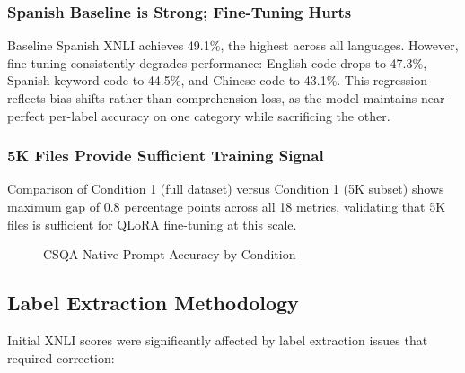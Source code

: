 \documentclass[conference]{IEEEtran}
\begin{document}
\subsubsection{Spanish Baseline is Strong; Fine-Tuning Hurts}
Baseline Spanish XNLI achieves 49.1\%, the highest across all languages. However, fine-tuning consistently degrades performance: English code drops to 47.3\%, Spanish keyword code to 44.5\%, and Chinese code to 43.1\%. This regression reflects bias shifts rather than comprehension loss, as the model maintains near-perfect per-label accuracy on one category while sacrificing the other.

\subsubsection{5K Files Provide Sufficient Training Signal}
Comparison of Condition 1 (full dataset) versus Condition 1 (5K subset) shows maximum gap of 0.8 percentage points across all 18 metrics, validating that 5K files is sufficient for QLoRA fine-tuning at this scale.

\begin{figure}[h]
\centering
{}
\caption{CSQA Native Prompt Accuracy by Condition}
\label{fig:csqa_results}
\end{figure}

\subsection{Label Extraction Methodology}
Initial XNLI scores were significantly affected by label extraction issues that required correction:
\end{document}
